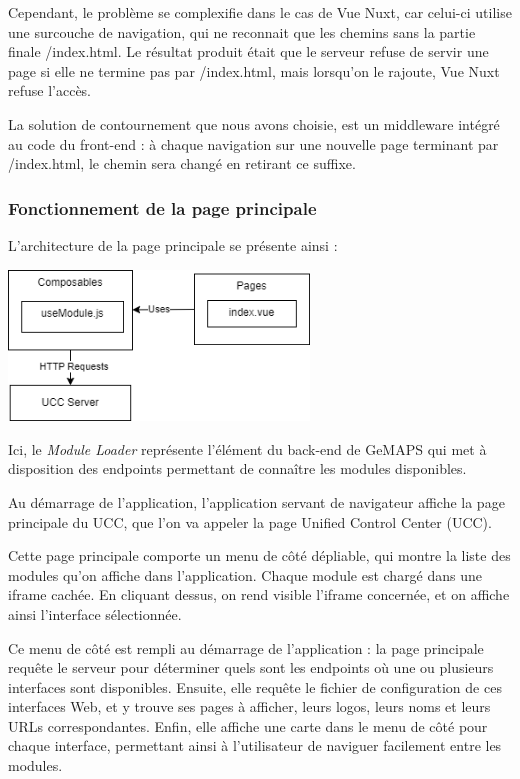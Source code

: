 \documentclass[francais]{rapportPFE}  %
\begin{document}
    Cependant, le problème se complexifie dans le cas de Vue Nuxt, car celui-ci utilise une surcouche de navigation, qui ne reconnait que les chemins sans la partie finale /index.html. Le résultat produit était que le serveur refuse de servir une page si elle ne termine pas par /index.html, mais lorsqu'on le rajoute, Vue Nuxt refuse l'accès.

    La solution de contournement que nous avons choisie, est un middleware intégré au code du front-end : à chaque navigation sur une nouvelle page terminant par /index.html, le chemin sera changé en retirant ce suffixe.






\subsubsection{Fonctionnement de la page principale}

L'architecture de la page principale se présente ainsi :

\begin{center}
    \centering
    \centering
    \includegraphics[width=8cm]{graphics/uccnuxt.png}
    \label{fig:test1}
\end{center}

Ici, le \textit{Module Loader} représente l'élément du back-end de GeMAPS qui met à disposition des endpoints permettant de connaître les modules disponibles.

Au démarrage de l'application, l'application servant de navigateur affiche la page principale du UCC, que l'on va appeler la page Unified Control Center (UCC).

Cette page principale comporte un menu de côté dépliable, qui montre la liste des modules qu'on affiche dans l'application. Chaque module est chargé dans une iframe cachée. En cliquant dessus, on rend visible l'iframe concernée, et on affiche ainsi l'interface sélectionnée.

Ce menu de côté est rempli au démarrage de l'application : la page principale requête le serveur pour déterminer quels sont les endpoints où une ou plusieurs interfaces sont disponibles. Ensuite, elle requête le fichier de configuration de ces interfaces Web, et y trouve ses pages à afficher, leurs logos, leurs noms et leurs URLs correspondantes. Enfin, elle affiche une carte dans le menu de côté pour chaque interface, permettant ainsi à l'utilisateur de naviguer facilement entre les modules.
\end{document}
